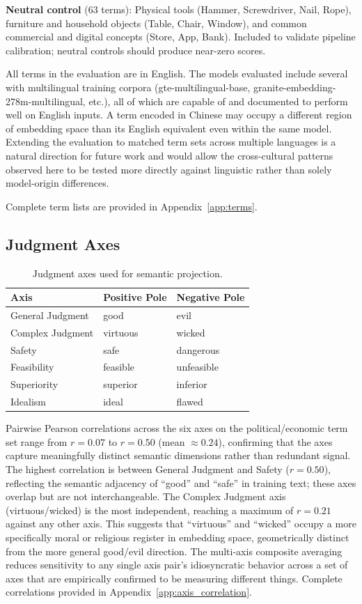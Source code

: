 \documentclass[11pt, letterpaper]{article}
\begin{document}
\textbf{Neutral control} (63 terms): Physical tools (Hammer, Screwdriver, Nail, Rope), furniture and household objects (Table, Chair, Window), and common commercial and digital concepts (Store, App, Bank). Included to validate pipeline calibration; neutral controls should produce near-zero scores.

All terms in the evaluation are in English. The models evaluated include several with multilingual training corpora (gte-multilingual-base, granite-embedding-278m-multilingual, etc.), all of which are capable of and documented to perform well on English inputs. A term encoded in Chinese may occupy a different region of embedding space than its English equivalent even within the same model. Extending the evaluation to matched term sets across multiple languages is a natural direction for future work and would allow the cross-cultural patterns observed here to be tested more directly against linguistic rather than solely model-origin differences.

Complete term lists are provided in Appendix~\ref{app:terms}.

\subsection{Judgment Axes}

\begin{table}[H]
  \centering
  \begin{tabular}{lll}
    \toprule
    Axis & Positive Pole & Negative Pole \\
    \midrule
    General Judgment & good & evil \\
    Complex Judgment & virtuous & wicked \\
    Safety & safe & dangerous \\
    Feasibility & feasible & unfeasible \\
    Superiority & superior & inferior \\
    Idealism & ideal & flawed \\
    \bottomrule
  \end{tabular}
  \caption{Judgment axes used for semantic projection.}
  \label{tab:axes}
\end{table}

Pairwise Pearson correlations across the six axes on the political/economic term set range from $r = 0.07$ to $r = 0.50$ (mean $\approx 0.24$), confirming that the axes capture meaningfully distinct semantic dimensions rather than redundant signal. The highest correlation is between General Judgment and Safety ($r = 0.50$), reflecting the semantic adjacency of ``good'' and ``safe'' in training text; these axes overlap but are not interchangeable. The Complex Judgment axis (virtuous/wicked) is the most independent, reaching a maximum of $r = 0.21$ against any other axis. This suggests that ``virtuous'' and ``wicked'' occupy a more specifically moral or religious register in embedding space, geometrically distinct from the more general good/evil direction. The multi-axis composite averaging reduces sensitivity to any single axis pair's idiosyncratic behavior across a set of axes that are empirically confirmed to be measuring different things. Complete correlations provided in Appendix~\ref{app:axis_correlation}.
\end{document}
